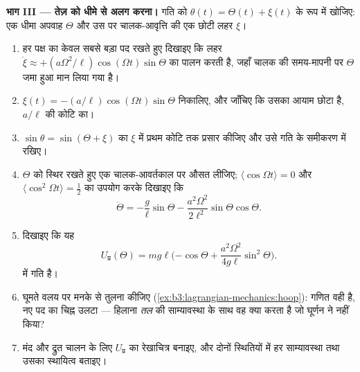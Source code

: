 \begin{problem}
\medskip\noindent\textbf{भाग III --- तेज़ को धीमे से अलग करना।}
गति को $\theta(t) = \Theta(t) + \xi(t)$ के रूप में खोजिए: एक धीमा
अपवाह $\Theta$ और उस पर चालक-आवृत्ति की एक छोटी लहर $\xi$।
\begin{enumerate}[resume]
  \item हर पक्ष का केवल सबसे बड़ा पद रखते हुए दिखाइए कि लहर
        $\ddot\xi \approx +(a\Omega^2/\ell)\cos(\Omega t)
        \sin\Theta$ का पालन करती है, जहाँ चालक की समय-मापनी पर
        $\Theta$ जमा हुआ मान लिया गया है।
  \item $\xi(t) = -(a/\ell)\cos(\Omega t)\sin\Theta$ निकालिए, और
        जाँचिए कि उसका आयाम छोटा है, $a/\ell$ की कोटि का।
  \item $\sin\theta = \sin(\Theta + \xi)$ का $\xi$ में प्रथम कोटि तक
        प्रसार कीजिए और उसे गति के समीकरण में रखिए।
  \item $\Theta$ को स्थिर रखते हुए एक चालक-आवर्तकाल पर औसत लीजिए;
        $\langle\cos\Omega t\rangle = 0$ और
        $\langle\cos^2\Omega t\rangle = \tfrac12$ का उपयोग करके दिखाइए
        कि
        \[
        \ddot\Theta = -\frac{g}{\ell}\sin\Theta
         - \frac{a^2\Omega^2}{2\ell^2}\sin\Theta\cos\Theta .
        \]
  \item दिखाइए कि यह 
        \[
        U_{\text{प्र}}(\Theta) = mg\ell\Big({-\cos\Theta}
         + \frac{a^2\Omega^2}{4g\ell}\sin^2\Theta\Big) .
        \]
        में गति है।
  \item घूमते वलय पर मनके से तुलना कीजिए
        (\cref{ex:b3:lagrangian-mechanics:hoop}): गणित वही है, नए पद
        का चिह्न उलटा --- हिलाना \emph{तल} की साम्यावस्था के साथ वह
        क्या करता है जो घूर्णन ने नहीं किया?
  \item मंद और द्रुत चालन के लिए $U_{\text{प्र}}$ का रेखाचित्र बनाइए,
        और दोनों स्थितियों में हर साम्यावस्था तथा उसका स्थायित्व
        बताइए।
\end{enumerate}


\end{problem}
